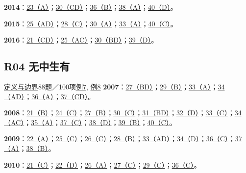 \documentclass[11pt,a4paper]{article}
\begin{document}
\noindent\textbf{2014}：\hyperref[idx-2014-T1-Q23]{23（A）}；\hyperref[idx-2014-T2-Q30]{30（CD）}；\hyperref[idx-2014-T4-Q36]{36（B）}；\hyperref[idx-2014-T4-Q38]{38（A）}；\hyperref[idx-2014-T4-Q40]{40（D）}。\par
\noindent\textbf{2015}：\hyperref[idx-2015-T1-Q25]{25（AD）}；\hyperref[idx-2015-T2-Q28]{28（C）}；\hyperref[idx-2015-T2-Q30]{30（A）}；\hyperref[idx-2015-T3-Q33]{33（A）}；\hyperref[idx-2015-T4-Q40]{40（C）}。\par
\noindent\textbf{2016}：\hyperref[idx-2016-T1-Q21]{21（CD）}；\hyperref[idx-2016-T1-Q25]{25（AC）}；\hyperref[idx-2016-T2-Q30]{30（BD）}；\hyperref[idx-2016-T4-Q39]{39（D）}。\par
{}
\subsection{R04 无中生有}\label{class-R04}
\noindent \hyperref[cat-R04]{定义与边界}\quad 88题／100项\quad \hyperref[case-2009-T2-Q26]{例7}, \hyperref[case-2016-T1-Q21]{例8}
\noindent\textbf{2007}：\hyperref[idx-2007-T2-Q27]{27（BD）}；\hyperref[idx-2007-T2-Q29]{29（B）}；\hyperref[idx-2007-T3-Q33]{33（A）}；\hyperref[idx-2007-T3-Q34]{34（AD）}；\hyperref[idx-2007-T4-Q36]{36（A）}；\hyperref[idx-2007-T4-Q37]{37（CD）}。\par
\noindent\textbf{2008}：\hyperref[idx-2008-T1-Q21]{21（B）}；\hyperref[idx-2008-T1-Q24]{24（C）}；\hyperref[idx-2008-T2-Q27]{27（B）}；\hyperref[idx-2008-T2-Q30]{30（C）}；\hyperref[idx-2008-T3-Q31]{31（BD）}；\hyperref[idx-2008-T3-Q32]{32（D）}；\hyperref[idx-2008-T3-Q33]{33（C）}；\hyperref[idx-2008-T3-Q34]{34（AC）}；\hyperref[idx-2008-T3-Q35]{35（A）}；\hyperref[idx-2008-T4-Q37]{37（C）}；\hyperref[idx-2008-T4-Q38]{38（D）}；\hyperref[idx-2008-T4-Q39]{39（B）}；\hyperref[idx-2008-T4-Q40]{40（C）}。\par
\noindent\textbf{2009}：\hyperref[idx-2009-T1-Q22]{22（A）}；\hyperref[idx-2009-T1-Q25]{25（C）}；\hyperref[idx-2009-T2-Q26]{26（C）}；\hyperref[idx-2009-T2-Q28]{28（B）}；\hyperref[idx-2009-T3-Q33]{33（AD）}；\hyperref[idx-2009-T3-Q34]{34（D）}；\hyperref[idx-2009-T4-Q36]{36（C）}；\hyperref[idx-2009-T4-Q37]{37（A）}；\hyperref[idx-2009-T4-Q38]{38（B）}。\par
\noindent\textbf{2010}：\hyperref[idx-2010-T1-Q21]{21（C）}；\hyperref[idx-2010-T1-Q22]{22（D）}；\hyperref[idx-2010-T2-Q26]{26（A）}；\hyperref[idx-2010-T2-Q27]{27（C）}；\hyperref[idx-2010-T2-Q29]{29（C）}；\hyperref[idx-2010-T4-Q36]{36（C）}。\par
\end{document}
